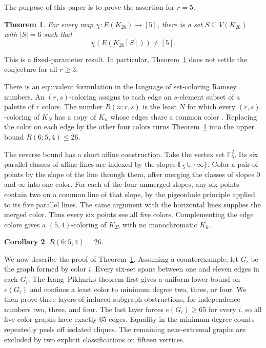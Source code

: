 \documentclass[11pt,reqno,a4paper]{amsart}
\newtheorem{theorem}{Theorem}[section]
\newtheorem{corollary}[theorem]{Corollary}
\theoremstyle{definition}
\theoremstyle{remark}
\newcommand{\Ffive}{\mathbb{F}_{5}}
\begin{document}
The purpose of this paper is to prove the assertion for $r=5$.

\begin{theorem}\label{thm:main}
For every map $\chi:E(K_{26})\to[5]$, there is a set
$S\subseteq V(K_{26})$ with $|S|=6$ such that
\[
  \chi\!\left(E(K_{26}[S])\right)\ne[5].
\]
\end{theorem}

This is a fixed-parameter result.  In particular, Theorem~\ref{thm:main} does
not settle the conjecture for all $r\geq 3$.

There is an equivalent formulation in the language of set-coloring Ramsey
numbers.  An $(r,s)$-coloring assigns to each edge an $s$-element subset of a
palette of $r$ colors.  The number $R(n;r,s)$ is the least $N$ for which every
$(r,s)$-coloring of $K_N$ has a copy of $K_n$ whose edges share a common color
\cite{ConlonEtAl2024}.  Replacing the color on each edge by the other four
colors turns Theorem~\ref{thm:main} into the upper bound $R(6;5,4)\leq26$.

The reverse bound has a short affine construction.  Take the vertex set
$\Ffive^2$.  Its six parallel classes of affine lines are indexed by the
slopes $\Ffive\cup\{\infty\}$.  Color a pair of points by the slope of the line
through them, after merging the classes of slopes $0$ and $\infty$ into one
color.  For each of the four unmerged slopes, any six points contain two on a
common line of that slope, by the pigeonhole principle applied to its five
parallel lines.  The same argument with the horizontal lines supplies the
merged color.  Thus every six points see all five colors.  Complementing the
edge colors gives a $(5,4)$-coloring of $K_{25}$ with no monochromatic $K_6$.

\begin{corollary}\label{cor:set-color}
$R(6;5,4)=26$.
\end{corollary}

We now describe the proof of Theorem~\ref{thm:main}.  Assuming a counterexample,
let $G_i$ be the graph formed by color $i$.  Every six-set spans between one
and eleven edges in each $G_i$.  The Kang--Pikhurko theorem first gives a
uniform lower bound on $e(G_i)$ and confines a least color to minimum degree
two, three, or four.  We then prove three layers of induced-subgraph
obstructions, for independence numbers two, three, and four.  The last layer
forces $e(G_i)\geq65$ for every $i$, so all five color graphs have exactly
$65$ edges.  Equality in the minimum-degree counts repeatedly peels off
isolated cliques.  The remaining near-extremal graphs are excluded by two
explicit classifications on fifteen vertices.
\end{document}
